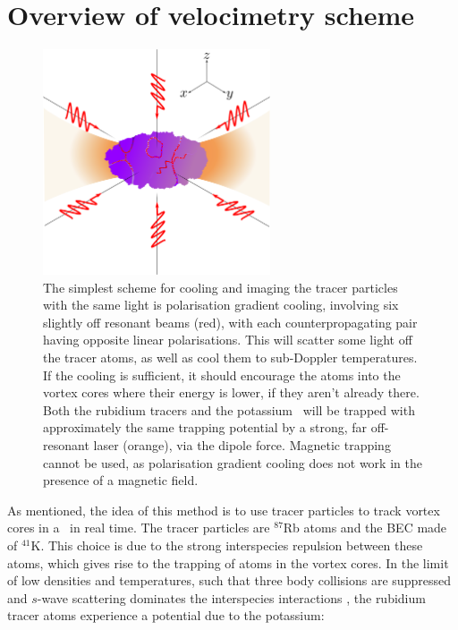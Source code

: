 \section{Overview of velocimetry scheme}

\begin{figure}
\begin{center}
\includegraphics[width=0.6\textwidth]{figures/unsorted/setup.png}
\caption{\label{fig:setup}The simplest scheme for cooling and imaging the tracer particles with the same light is polarisation gradient cooling, involving six slightly off resonant beams (red), with each counterpropagating pair having opposite linear polarisations. This will scatter some light off the tracer atoms, as well as cool them to sub-Doppler temperatures. If the cooling is sufficient, it should encourage the atoms into the vortex cores where their energy is lower, if they aren't already there. Both the rubidium tracers and the potassium \bec\ will be trapped with approximately the same trapping potential by a strong, far off-resonant laser (orange), via the dipole force. Magnetic trapping cannot be used, as polarisation gradient cooling does not work in the presence of a magnetic field.}
\end{center}
\end{figure}

As mentioned, the idea of this method is to use tracer particles to track vortex cores in a \bec\ in real time. The tracer particles are $^{87}$Rb atoms and the BEC made of $^{41}$K. This choice is due to the strong interspecies repulsion between these atoms, which gives rise to the trapping of atoms in the vortex cores. In the limit of low densities and temperatures, such that three body collisions are suppressed and $s$-wave scattering dominates the interspecies interactions \cite[p 120]{leggett_quantum_2006}, the rubidium tracer atoms experience a potential due to the potassium:

